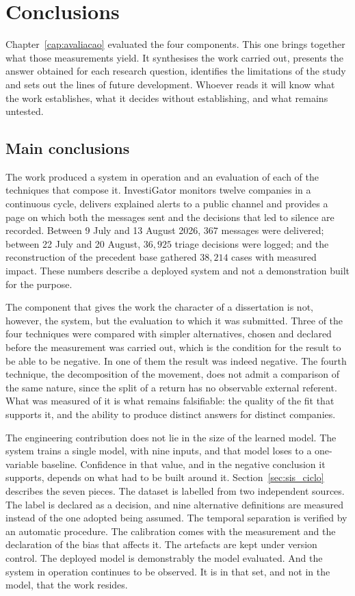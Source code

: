 \chapter{Conclusions}
\label{cap:conclusoes}

Chapter~\ref{cap:avaliacao} evaluated the four components. This one brings together what
those measurements yield. It synthesises the work carried out, presents the answer obtained for
each research question, identifies the limitations of the study and sets out the lines of future
development. Whoever reads it will know what the work establishes, what it decides without establishing, and what remains untested.

\section{Main conclusions}
\label{sec:con_principais}

The work produced a system in operation and an evaluation of each of the techniques that compose
it. InvestiGator monitors twelve companies in a continuous cycle, delivers explained alerts to a
public channel and provides a page on which both the messages sent and the decisions that led to
silence are recorded. Between 9 July and 13 August 2026, $367$ messages were delivered; between
22 July and 20 August, $36{,}925$ triage decisions were logged; and the reconstruction of the
precedent base gathered $38{,}214$ cases with
measured impact. These
numbers describe a deployed system and not a demonstration built for the purpose.

The component that gives the work the character of a dissertation is not, however, the system, but
the evaluation to which it was submitted. Three of the four techniques were compared with simpler
alternatives, chosen and declared before the measurement was carried out, which is the condition
for the result to be able to be negative. In one of them the result was indeed negative. The fourth
technique, the decomposition of the movement, does not admit a comparison of the same nature, since
the split of a return has no observable external referent. What was measured of it is what remains
falsifiable: the quality of the fit that supports it, and the ability to produce distinct answers
for distinct companies.

The engineering contribution does not lie in the size of the learned model. The system trains a
single model, with nine inputs, and that model loses to a one-variable baseline. Confidence in that
value, and in the negative conclusion it supports, depends on what had to be built around it.
Section~\ref{sec:sis_ciclo} describes the seven pieces. The dataset is labelled from two
independent sources. The label is declared as a decision, and nine alternative definitions are
measured instead of the one adopted being assumed. The temporal separation is verified by an
automatic procedure. The calibration comes with the measurement and the declaration of the bias
that affects it. The artefacts are kept under version control. The deployed model is demonstrably
the model evaluated. And the system in operation continues to be observed. It is in that set, and
not in the model, that the work resides.

